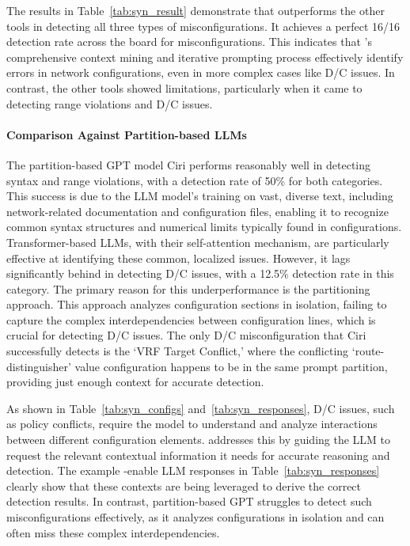 The results in Table~\ref{tab:syn_result} demonstrate that \sysname{} outperforms the other tools in detecting all three types of misconfigurations. It achieves a perfect 16/16 detection rate across the board for misconfigurations. This indicates that \sysname{}'s comprehensive context mining and iterative prompting process effectively identify errors in network configurations, even in more complex cases like D/C issues. In contrast, the other tools showed limitations, particularly when it came to detecting range violations and D/C issues.


\paragraph{Comparison Against Partition-based LLMs} The partition-based GPT model Ciri performs reasonably well in detecting syntax and range violations, with a detection rate of 50\% for both categories.
This success is due to the LLM model's training on vast, diverse text, including network-related documentation and configuration files, enabling it to recognize common syntax structures and numerical limits typically found in configurations. Transformer-based LLMs, with their self-attention mechanism, are particularly effective at identifying these common, localized issues.
However, it lags significantly behind \sysname{} in detecting D/C issues, with a 12.5\% detection rate in this category. The primary reason for this underperformance is the partitioning approach. This approach analyzes configuration sections in isolation, failing to capture the complex interdependencies between configuration lines, which is crucial for detecting D/C issues. The only D/C misconfiguration that Ciri successfully detects is the `VRF Target Conflict,' where the conflicting `route-distinguisher' value configuration happens to be in the same prompt partition, providing just enough context for accurate detection.

As shown in Table~\ref{tab:syn_configs} and~\ref{tab:syn_responses}, D/C issues, such as policy conflicts, require the model to understand and analyze interactions between different configuration elements.
\sysname{} addresses this by guiding the LLM to request the relevant contextual information it needs for accurate reasoning and detection. The example \sysname{}-enable LLM responses in Table~\ref{tab:syn_responses} clearly show that these contexts are being leveraged to derive the correct detection results. In contrast, partition-based GPT struggles to detect such misconfigurations effectively, as it analyzes configurations in isolation and can often miss these complex interdependencies.

